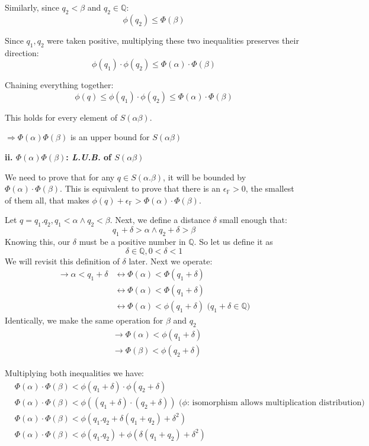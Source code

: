 \begin{bookproof}
Similarly, since $q_2 < \beta$ and $q_2 \in \mathbb{Q}$:
$$\phi(q_2) \leq \Phi(\beta)$$

Since $q_1, q_2$ were taken positive, multiplying these two inequalities preserves their direction:
$$\phi(q_1) \cdot \phi(q_2) \leq \Phi(\alpha) \cdot \Phi(\beta)$$

Chaining everything together:
$$\phi(q) \leq \phi(q_1) \cdot \phi(q_2) \leq \Phi(\alpha) \cdot \Phi(\beta)$$

This holds for every element of $S(\alpha\beta)$.

\begin{center}
$\Rightarrow \Phi(\alpha)\Phi(\beta)$ is an upper bound for $S(\alpha\beta)$
\end{center}
\end{bookproof}

\begin{bookproof}
\textbf{ii. $\Phi(\alpha)\Phi(\beta)$: \textit{L.U.B.} of $S(\alpha\beta)$}

We need to prove that for any $q \in S(\alpha . \beta)$, it will be bounded by $\Phi(\alpha) \cdot \Phi(\beta)$. This is equivalent to prove that there is an $\epsilon _\mathbb{F} > 0$, the smallest of them all, that makes $\phi(q) + \epsilon _\mathbb{F} > \Phi(\alpha) \cdot \Phi(\beta)$.

Let $q = q_1 . q_2, q_1 < \alpha \wedge q_2 < \beta$. Next, we define a distance $\delta$ small enough that:
$$
q_1 + \delta > \alpha \wedge q_2 + \delta > \beta
$$
Knowing this, our $\delta$ must be a positive number in $\mathbb{Q}$. So let us define it as
$$
\delta \in \mathbb{Q}, 0 < \delta < 1
$$
We will revisit this definition of $\delta$ later. Next we operate:
\begin{align*}
\rightarrow \alpha < q_1 + \delta &\leftrightarrow \Phi(\alpha) < \Phi(q_1 + \delta) \\
&\leftrightarrow \Phi(\alpha) < \Phi(q_1 + \delta) \\
&\leftrightarrow \Phi(\alpha) < \phi(q_1 + \delta) \text{ ($q_1 + \delta \in \mathbb{Q}$)}
\end{align*}
Identically, we make the same operation for $\beta$ and $q_2$
\begin{align*}
&\rightarrow \Phi(\alpha) < \phi(q_1 + \delta) \\
&\rightarrow \Phi(\beta) < \phi(q_2 + \delta)
\end{align*}

Multiplying both inequalities we have:
\begin{align*}
&\Phi(\alpha) \cdot \Phi(\beta) < \phi(q_1 + \delta) \cdot \phi(q_2 + \delta) \\
&\Phi(\alpha) \cdot \Phi(\beta) < \phi((q_1 + \delta) \cdot (q_2 + \delta)) \text{ ($\phi$: isomorphism allows multiplication distribution)} \\
&\Phi(\alpha) \cdot \Phi(\beta) < \phi(q_1.q_2 + \delta(q_1 + q_2) + \delta^2) \\
&\Phi(\alpha) \cdot \Phi(\beta) < \phi(q_1.q_2) + \phi(\delta(q_1 + q_2) + \delta ^2)
\end{align*}


\end{bookproof}
